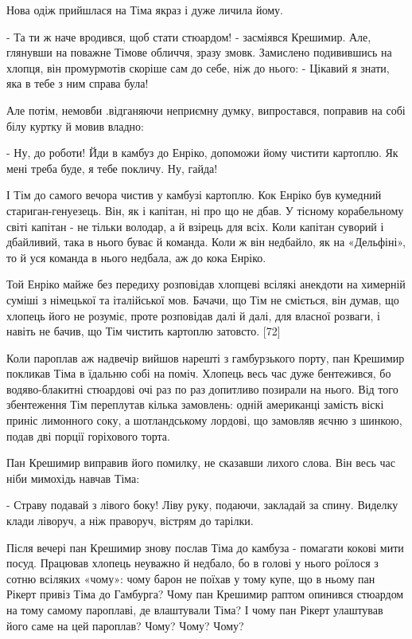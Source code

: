 Нова одіж прийшлася на Тіма якраз і дуже личила йому.

- Та ти ж наче вродився, щоб стати стюардом! - засміявся Крешимир. Але, глянувши на поважне Тімове обличчя, зразу змовк. Замислено подивившись на хлопця, він промурмотів скоріше сам до себе, ніж до нього: - Цікавий я знати, яка в тебе з ним справа була!

Але потім, немовби .відганяючи неприємну думку, випростався, поправив на собі білу куртку й мовив владно:

- Ну, до роботи! Йди в камбуз до Енріко, допоможи йому чистити картоплю. Як мені треба буде, я тебе покличу. Ну, гайда!

І Тім до самого вечора чистив у камбузі картоплю. Кок Енріко був кумедний стариган-генуезець. Він, як і капітан, ні про що не дбав. У тісному корабельному світі капітан - не тільки володар, а й взірець для всіх. Коли капітан суворий і дбайливий, така в нього буває й команда. Коли ж він недбайло, як на «Дельфіні», то й уся команда в нього недбала, аж до кока Енріко.

Той Енріко майже без передиху розповідав хлопцеві всілякі анекдоти на химерній суміші з німецької та італійської мов. Бачачи, що Тім не сміється, він думав, що хлопець його не розуміє, проте розповідав далі й далі, для власної розваги, і навіть не бачив, що Тім чистить картоплю затовсто. [72]

Коли пароплав аж надвечір вийшов нарешті з гамбурзького порту, пан Крешимир покликав Тіма в їдальню собі на поміч. Хлопець весь час дуже бентежився, бо водяво-блакитні стюардові очі раз по раз допитливо позирали на нього. Від того збентеження Тім переплутав кілька замовлень: одній американці замість віскі приніс лимонного соку, а шотландському лордові, що замовляв яєчню з шинкою, подав дві порції горіхового торта.

Пан Крешимир виправив його помилку, не сказавши лихого слова. Він весь час ніби мимохідь навчав Тіма:

- Страву подавай з лівого боку! Ліву руку, подаючи, закладай за спину. Виделку клади ліворуч, а ніж праворуч, вістрям до тарілки.

Після вечері пан Крешимир знову послав Тіма до камбуза - помагати кокові мити посуд. Працював хлопець неуважно й недбало, бо в голові у нього роїлося з сотню всіляких «чому»: чому барон не поїхав у тому купе, що в ньому пан Рікерт привіз Тіма до Гамбурга? Чому пан Крешимир раптом опинився стюардом на тому самому пароплаві, де влаштували Тіма? І чому пан Рікерт улаштував його саме на цей пароплав? Чому? Чому? Чому?

